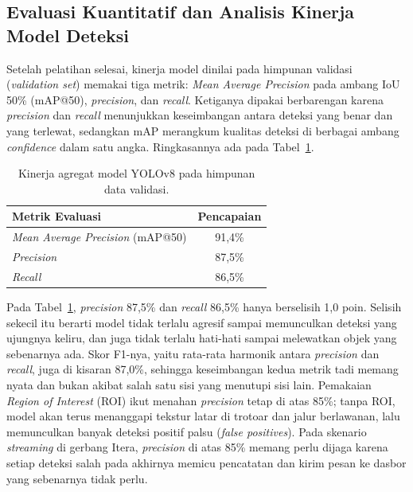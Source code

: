 \subsection{Evaluasi Kuantitatif dan Analisis Kinerja Model Deteksi}
\label{subsec:evaluasi-kinerja}

Setelah pelatihan selesai, kinerja model dinilai pada himpunan validasi (\textit{validation set}) memakai tiga metrik: \textit{Mean Average Precision} pada ambang IoU 50\% (mAP@50), \textit{precision}, dan \textit{recall}. Ketiganya dipakai berbarengan karena \textit{precision} dan \textit{recall} menunjukkan keseimbangan antara deteksi yang benar dan yang terlewat, sedangkan mAP merangkum kualitas deteksi di berbagai ambang \textit{confidence} dalam satu angka. Ringkasannya ada pada Tabel~\ref{tab:metrik-validasi}.

\begin{table}[htbp]
\centering
\caption{Kinerja agregat model YOLOv8 pada himpunan data validasi.}
\label{tab:metrik-validasi}
\begin{tabular}{lc}
\toprule
\textbf{Metrik Evaluasi} & \textbf{Pencapaian} \\
\midrule
\textit{Mean Average Precision} (mAP@50) & 91,4\% \\
\textit{Precision}  & 87,5\% \\
\textit{Recall}     & 86,5\% \\
\bottomrule
\end{tabular}
\end{table}

Pada Tabel~\ref{tab:metrik-validasi}, \textit{precision} 87,5\% dan \textit{recall} 86,5\% hanya berselisih 1,0 poin. Selisih sekecil itu berarti model tidak terlalu agresif sampai memunculkan deteksi yang ujungnya keliru, dan juga tidak terlalu hati-hati sampai melewatkan objek yang sebenarnya ada. Skor F1-nya, yaitu rata-rata harmonik antara \textit{precision} dan \textit{recall}, juga di kisaran 87,0\%, sehingga keseimbangan kedua metrik tadi memang nyata dan bukan akibat salah satu sisi yang menutupi sisi lain. Pemakaian \textit{Region of Interest} (ROI) ikut menahan \textit{precision} tetap di atas 85\%; tanpa ROI, model akan terus menanggapi tekstur latar di trotoar dan jalur berlawanan, lalu memunculkan banyak deteksi positif palsu (\textit{false positives}). Pada skenario \textit{streaming} di gerbang Itera, \textit{precision} di atas 85\% memang perlu dijaga karena setiap deteksi salah pada akhirnya memicu pencatatan dan kirim pesan ke dasbor yang sebenarnya tidak perlu.

